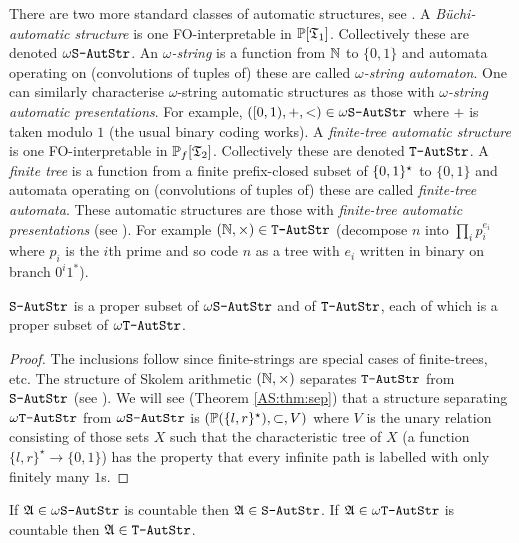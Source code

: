 There are two more standard classes of automatic structures, see \cite{Blum99}.
A {\em B\"uchi-automatic structure} is one FO-interpretable in ${\mathbb P}[\mathfrak{T}_1]$. Collectively these are denoted $\mbox{\tt $\omega$S-AutStr}$. An {\em $\omega$-string} is a function from $\mathbb{N}$ to $\{0,1\}$ and automata operating on (convolutions of tuples of) these are called {\em $\omega$-string automaton}. One can similarly characterise $\omega$-string automatic structures as those with {\em $\omega$-string automatic presentations}. For example, $([0,1),+,<) \in \mbox{\tt $\omega$S-AutStr}$ where $+$ is taken modulo $1$ (the usual binary coding works).
A {\em finite-tree automatic structure} is one FO-interpretable in ${\mathbb P}_f[\mathfrak{T}_2]$. Collectively these are denoted $\mbox{\tt T-AutStr}$. A {\em finite tree} is a function from a finite prefix-closed subset of $\{0,1\}^\star$ to $\{0,1\}$ and automata operating on (convolutions of tuples of) these are called {\em finite-tree automata}. These automatic structures are those with {\em finite-tree automatic presentations} (see \cite{Blum99,BeLiNe07}). For example  $(\mathbb{N},\times) \in \mbox{\tt T-AutStr}$ (decompose $n$ into
$\prod_{i} p_i^{e_i}$ where $p_i$ is the $i$th prime and so code $n$ as a tree with $e_i$ written in binary on
branch $0^i1^\ast$).  


\begin{proposition} \label{AS:prop:relations}
$\mbox{\tt S-AutStr}$ is a proper subset of $\mbox{\tt $\omega$S-AutStr}$ and of $\mbox{\tt T-AutStr}$, each of which is a proper subset of $\mbox{\tt $\omega$T-AutStr}$.
\end{proposition} 

\begin{proof} The inclusions follow since finite-strings are special cases of finite-trees, etc.
The structure of Skolem arithmetic $(\mathbb{N},\times)$ separates $\mbox{\tt T-AutStr}$ from $\mbox{\tt S-AutStr}$ (see \cite{Blum99}).
We will see (Theorem \ref{AS:thm:sep}) that a structure separating $\mbox{\tt $\omega$T-AutStr}$ from $\mbox{\tt $\omega$S-AutStr}$ is $({\mathbb P}(\{l,r\}^\star),\subset,V)$ where $V$ is the unary relation consisting of those sets $X$ such that the characteristic tree of $X$ (a function $\{l,r\}^\star \to \{0,1\}$) has the property that every infinite path is labelled with only finitely many $1$s.
\end{proof}

\begin{proposition} 
If $\mathfrak{A} \in \mbox{\tt $\omega$S-AutStr}$ is countable then $\mathfrak{A} \in \mbox{\tt S-AutStr}$.
If $\mathfrak{A} \in \mbox{\tt $\omega$T-AutStr}$ is countable then $\mathfrak{A} \in \mbox{\tt T-AutStr}$.
\end{proposition}

